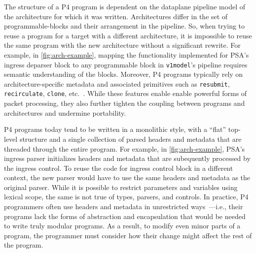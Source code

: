 \documentclass[letterpaper,twocolumn,10pt]{article}
\begin{document}
%
The structure of a P4 program is dependent on the dataplane pipeline
model of the architecture for which it was written. Architectures
differ in the set of programmable-blocks and their arrangement in the
pipeline. So, when trying to reuse a program for a target with a
different architecture, it is impossible to reuse the same program
with the new architecture without a significant rewrite. For example,
in \cref{fig:arch-example}, mapping the functionality implemented for
PSA's ingress deparser block to any programmable block in
\texttt{v1model}'s pipeline requires semantic understanding of the
blocks. Moreover, P4 programs typically rely on architecture-specific
metadata and associated primitives such as \texttt{resubmit},
\texttt{recirculate}, \texttt{clone},
etc.~\cite{simple_switch.md,psa}. While these features enable enable
powerful forms of packet processing, they also further tighten the
coupling between programs and architectures and undermine portability.

P4 programs today tend to be written in a monolithic style, with a
``flat'' top-level structure and a single collection of parsed headers
and metadata that are threaded through the entire program. For
example, in \cref{fig:arch-example}, PSA's ingress parser initializes
headers and metadata that are subequently processed by the ingress
control. To reuse the code for ingress control block in a different
context, the new parser would have to use the same headers and
metadata as the original parser. While it is possible to restrict
parameters and variables using lexical scope, the same is not true of
types, parsers, and controls. In practice, P4 programmers often use
headers and metadata in unrestricted ways~\cite{switch.p4}---i.e.,
their programs lack the forms of abstraction and encapsulation that
would be needed to write truly modular programs. As a result, to
modify even minor parts of a program, the programmer must consider how
their change might affect the rest of the program.
\end{document}
